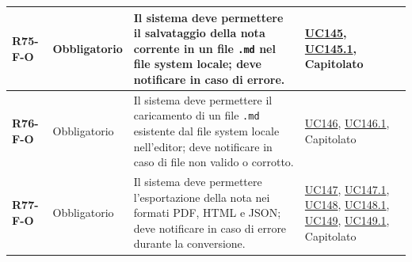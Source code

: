 \begin{longtable}{|p{2.5cm}|p{2.2cm}|p{6.8cm}|p{2.7cm}|}
	\textbf{R75-F-O} & Obbligatorio & Il sistema deve permettere il salvataggio della nota corrente in un file \texttt{.md} nel file system locale; deve notificare in caso di errore. & \hyperlink{uc145}{UC145}, \hyperlink{uc145.1}{UC145.1}, Capitolato \\ \hline
	\textbf{R76-F-O} & Obbligatorio & Il sistema deve permettere il caricamento di un file \texttt{.md} esistente dal file system locale nell'editor; deve notificare in caso di file non valido o corrotto. & \hyperlink{uc146}{UC146}, \hyperlink{uc146.1}{UC146.1}, Capitolato \\ \hline
	\textbf{R77-F-O} & Obbligatorio & Il sistema deve permettere l'esportazione della nota nei formati PDF, HTML e JSON; deve notificare in caso di errore durante la conversione. & \hyperlink{uc147}{UC147}, \hyperlink{uc147.1}{UC147.1}, \hyperlink{uc148}{UC148}, \hyperlink{uc148.1}{UC148.1}, \hyperlink{uc149}{UC149}, \hyperlink{uc149.1}{UC149.1}, Capitolato \\ \hline


\end{longtable}
